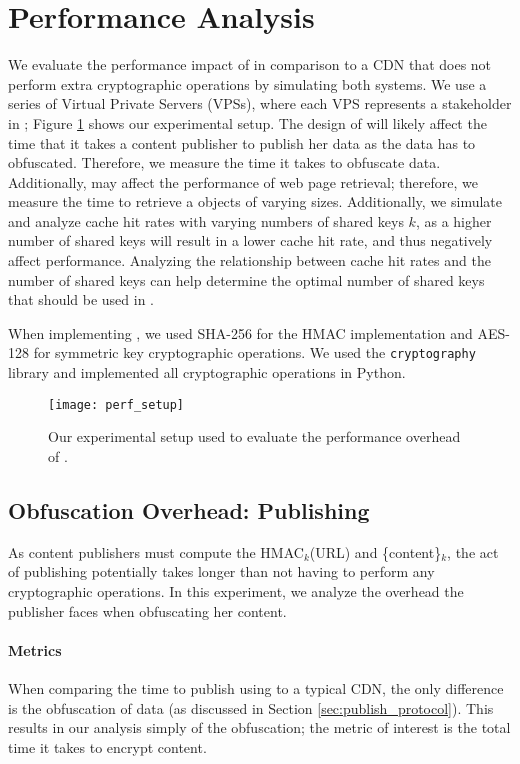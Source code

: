 \section{Performance Analysis}
\label{sec:performance}

We evaluate the performance impact of \system{} in comparison to a CDN that does not perform extra cryptographic operations by simulating both systems.   
We use a series of Virtual Private Servers (VPSs), where each VPS represents a stakeholder in \system{}; Figure \ref{fig:perf_setup} shows our 
experimental setup.  The design of \system{} will likely affect the time that it takes a content publisher to publish her data as
the data has to obfuscated.  Therefore, we measure the time it takes to obfuscate data.  Additionally, \system{} may affect the performance of web page retrieval; therefore, we measure the time to retrieve a objects of varying sizes.  Additionally, we simulate and analyze cache hit rates with varying numbers of 
shared keys $k$, as a higher number of shared keys will result in a lower cache hit rate, and thus negatively affect performance. Analyzing the relationship between cache hit
rates and the number of shared keys can help determine the optimal number of shared keys that should be used in \system{}.

When implementing \system{}, we used SHA-256 for the HMAC implementation and AES-128 for symmetric key cryptographic operations.  We used the {\tt cryptography} library and implemented 
all cryptographic operations in Python.  

\begin{figure}[t]
\centering
\texttt{[image: perf\_setup]}
\caption{Our experimental setup used to evaluate the performance overhead of \system{}.}
\label{fig:perf_setup}
\end{figure}

\subsection{Obfuscation Overhead: Publishing}
As content publishers must compute the HMAC$_k$(URL) and \{content\}$_k$, the act of publishing potentially 
takes longer than not having to perform any cryptographic operations.  In this experiment, we analyze the overhead 
the publisher faces when obfuscating her content.\\

\paragraph{Metrics}
When comparing the time to publish using \system{} to a typical CDN, the only difference is the obfuscation of 
data (as discussed in Section \ref{sec:publish_protocol}).  This results in our analysis simply of the 
obfuscation; the metric of interest is the total time it takes to encrypt content.  \\

